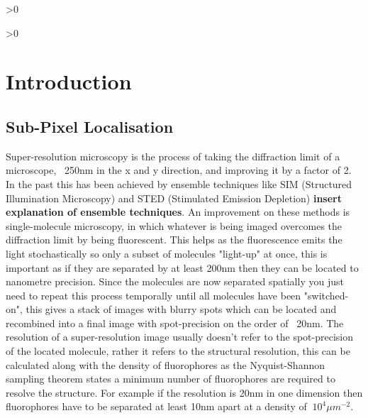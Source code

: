 \documentclass[aps,pra,a4paper,nofootinbib,onecolumn,tightenlines,longbibliography,12pt,amsfonts,amssymb,amsmath,floatfix]{revtex4-2} %
\begin{document}
\newpage
\tableofcontents %
\makeatletter
\let\toc@pre\relax
\let\toc@post\relax
\makeatother

\ifnum\totalfigures>0
\newpage
\listoffigures
{}
\fi

\ifnum\totaltables>0
\newpage
\listoftables
{}
\fi





\newpage
{}

\section{Introduction}

  \subsection{Sub-Pixel Localisation} %
  \label{sub:spot-finding intro}
  
  Super-resolution microscopy is the process of taking the diffraction limit 
  of a microscope, ~250nm in the x and y direction, and improving it by a 
  factor of 2. In the past this has been achieved by ensemble techniques
  like SIM (Structured Illumination Microscopy) and STED (Stimulated Emission Depletion)
  \textbf{insert explanation of ensemble techniques}. An improvement on these methods 
  is single-molecule microscopy, in which whatever is being imaged overcomes the 
  diffraction limit by being fluorescent. This helps as the fluorescence emits the light 
  stochastically so only a subset of molecules "light-up" at once, this is important 
  as if they are separated by at least 200nm then they can be located to nanometre precision. 
  Since the molecules are now separated spatially you just need to repeat this process temporally
  until all molecules have been "switched-on", this gives a stack of images with blurry spots
  which can be located and recombined into a final image with spot-precision on the order of ~20nm.\cite{galbraith2011super}
  The resolution of a super-resolution image usually doesn't refer to the spot-precision of the 
  located molecule, rather it refers to the structural resolution, this can be calculated along 
  with the density of fluorophores as the Nyquist-Shannon sampling theorem states a minimum number 
  of fluorophores are required to resolve the structure. For example if the resolution is 20nm in 
  one dimension then fluorophores have to be separated at least 10nm apart at a density of 
  $~10^4\mu m^{-2}$.\cite{van2011single}\cite{shannon1949communication}
\end{document}
